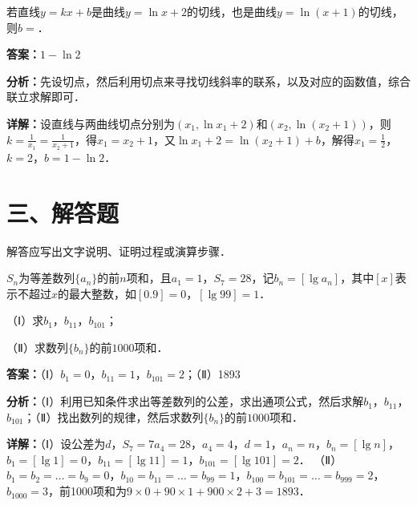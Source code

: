 \begin{question}[points=5]
若直线$y=kx+b$是曲线$y=\ln x+2$的切线，也是曲线$y=\ln(x+1)$的切线，则$b=$．
\fillin[{$1-\ln2$}]
\begin{solution}
\textbf{答案：}$1-\ln2$

\textbf{分析：}先设切点，然后利用切点来寻找切线斜率的联系，以及对应的函数值，综合联立求解即可．

\textbf{详解：}设直线与两曲线切点分别为$(x_1,\ln x_1+2)$和$(x_2,\ln(x_2+1))$，则$k=\frac{1}{x_1}=\frac{1}{x_2+1}$，得$x_1=x_2+1$，又$\ln x_1+2=\ln(x_2+1)+b$，解得$x_1=\frac12$，$k=2$，$b=1-\ln2$．
\end{solution}
\end{question}

\section*{三、解答题}
解答应写出文字说明、证明过程或演算步骤．

\begin{question}[points=12]
$S_n$为等差数列$\{a_n\}$的前$n$项和，且$a_1=1$，$S_7=28$，记$b_n=[\lg a_n]$，其中$[x]$表示不超过$x$的最大整数，如$[0.9]=0$，$[\lg 99]=1$．

（Ⅰ）求$b_1$，$b_{11}$，$b_{101}$；

（Ⅱ）求数列$\{b_n\}$的前$1000$项和．
\begin{solution}
\textbf{答案：}（Ⅰ）$b_1=0$，$b_{11}=1$，$b_{101}=2$；（Ⅱ）1893

\textbf{分析：}（Ⅰ）利用已知条件求出等差数列的公差，求出通项公式，然后求解$b_1$，$b_{11}$，$b_{101}$；（Ⅱ）找出数列的规律，然后求数列$\{b_n\}$的前$1000$项和．

\textbf{详解：}（Ⅰ）设公差为$d$，$S_7=7a_4=28$，$a_4=4$，$d=1$，$a_n=n$，$b_n=[\lg n]$，$b_1=[\lg 1]=0$，$b_{11}=[\lg 11]=1$，$b_{101}=[\lg 101]=2$．
（Ⅱ）$b_1=b_2=\ldots=b_9=0$，$b_{10}=b_{11}=\ldots=b_{99}=1$，$b_{100}=b_{101}=\ldots=b_{999}=2$，$b_{1000}=3$，前1000项和为$9\times0+90\times1+900\times2+3=1893$．
\end{solution}
\end{question}

